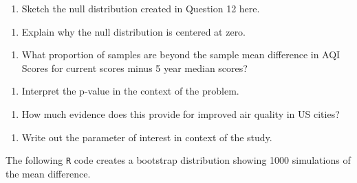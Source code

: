\documentclass[
]{report}
\providecommand{\tightlist}{%
  \setlength{\itemsep}{0pt}\setlength{\parskip}{0pt}}
\begin{document}
\begin{enumerate}
\def\labelenumi{\arabic{enumi}.}
\setcounter{enumi}{12}
\tightlist
\item
  Sketch the null distribution created in Question 12 here.
\end{enumerate}

\vspace{2in}

\begin{enumerate}
\def\labelenumi{\arabic{enumi}.}
\setcounter{enumi}{13}
\tightlist
\item
  Explain why the null distribution is centered at zero.
\end{enumerate}

\vspace{.5in}

\begin{enumerate}
\def\labelenumi{\arabic{enumi}.}
\setcounter{enumi}{14}
\tightlist
\item
  What proportion of samples are beyond the sample mean difference in AQI Scores for current scores minus 5 year median scores?
\end{enumerate}

\newpage

\begin{enumerate}
\def\labelenumi{\arabic{enumi}.}
\setcounter{enumi}{15}
\tightlist
\item
  Interpret the p-value in the context of the problem.
\end{enumerate}

\vspace{1in}

\begin{enumerate}
\def\labelenumi{\arabic{enumi}.}
\setcounter{enumi}{16}
\tightlist
\item
  How much evidence does this provide for improved air quality in US cities?
\end{enumerate}

\vspace{.5in}

\begin{enumerate}
\def\labelenumi{\arabic{enumi}.}
\setcounter{enumi}{17}
\tightlist
\item
  Write out the parameter of interest in context of the study.
\end{enumerate}

\vspace{1in}

The following \texttt{R} code creates a bootstrap distribution showing 1000 simulations of the mean difference.
\end{document}
